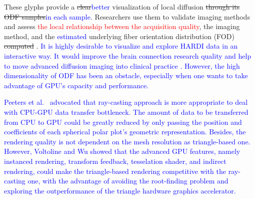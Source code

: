 \documentclass[twoside,twocolumn,10pt]{article}
\begin{document}

These glyphs provide a \sout{clear}\textcolor{blue}{better} visualization of local diffusion \sout{through its ODF samples}\textcolor{blue}{in each sample}. Researchers use them to validate imaging methods \cite{descoteaux2007_QBI,  TuchQBall2004,tournier2007,Tournier2004DirectEO, tuch2002,  yeh2010} and assess \textcolor{red}{the local relationship between the acquisition quality}, the imaging method, and the \textcolor{blue}{estimated} underlying fiber orientation distribution (FOD) \sout{computed} \cite{cho2008, daducci2014,descoteaux2007,  vega2009}. %
\textcolor{blue}{It is highly desirable to visualize and explore HARDI data in an interactive way. It would improve the brain connection research quality and help to move advanced diffusion imaging into clinical practice \cite{peeters2009}. However, the high dimensionality of ODF has been an obstacle, especially when one wants to take advantage of GPU's capacity and performance.} 

\textcolor{blue}{Peeters et al.~\cite{peeters2009} advocated that ray-casting approach is more appropriate to deal with CPU-GPU data transfer bottleneck. The amount of data to be transferred from CPU to GPU could be greatly reduced by only passing the position and coefficients of each spherical polar plot's geometric representation. Besides, the rendering quality is not dependent on the mesh resolution as triangle-based one. However, Voltoline and Wu showed that the advanced GPU features, namely instanced rendering, transform feedback, tesselation shader, and indirect rendering, could make the triangle-based rendering competitive with the ray-casting one, with the advantage of avoiding the root-finding problem and exploring the outperformance of the triangle hardware graphics accelerator.} 
\end{document}
